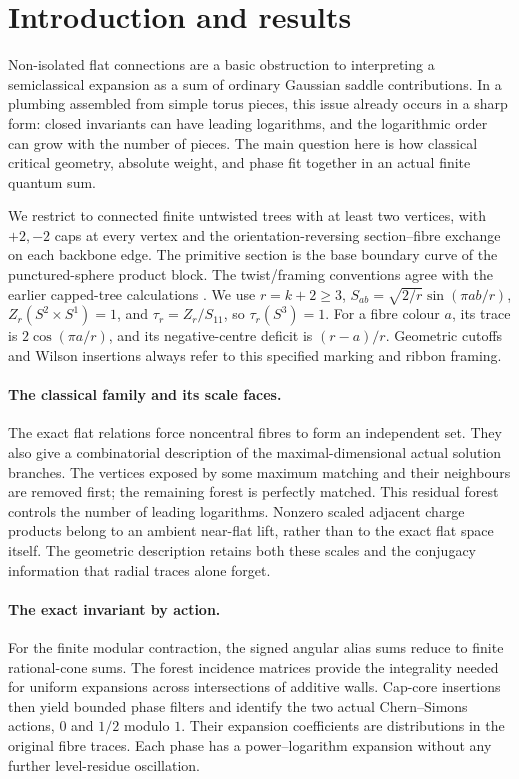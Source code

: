 \section{Introduction and results}\label{intro:main}
Non-isolated flat connections are a basic obstruction to interpreting a semiclassical expansion as a sum of ordinary Gaussian saddle contributions. In a plumbing assembled from simple torus pieces, this issue already occurs in a sharp form: closed invariants can have leading logarithms, and the logarithmic order can grow with the number of pieces. The main question here is how classical critical geometry, absolute weight, and phase fit together in an actual finite quantum sum.

We restrict to connected finite untwisted trees with at least two vertices, with \(+2,-2\) caps at every vertex and the orientation-reversing section--fibre exchange on each backbone edge. The primitive section is the base boundary curve of the punctured-sphere product block. The twist/framing conventions agree with the earlier capped-tree calculations \cite{P48,P49,P49B,P4849}. We use \(r=k+2\geq 3\), \(S_{ab}=\sqrt{2/r}\sin(\pi ab/r)\), \(Z_r(S^2\times S^1)=1\), and \(\tau_r=Z_r/S_{11}\), so \(\tau_r(S^3)=1\). For a fibre colour \(a\), its trace is \(2\cos(\pi a/r)\), and its negative-centre deficit is \((r-a)/r\). Geometric cutoffs and Wilson insertions always refer to this specified marking and ribbon framing.

\paragraph{The classical family and its scale faces.}
The exact flat relations force noncentral fibres to form an independent set. They also give a combinatorial description of the maximal-dimensional actual solution branches. The vertices exposed by some maximum matching and their neighbours are removed first; the remaining forest is perfectly matched. This residual forest controls the number of leading logarithms. Nonzero scaled adjacent charge products belong to an ambient near-flat lift, rather than to the exact flat space itself. The geometric description retains both these scales and the conjugacy information that radial traces alone forget.

\paragraph{The exact invariant by action.}
For the finite modular contraction, the signed angular alias sums reduce to finite rational-cone sums. The forest incidence matrices provide the integrality needed for uniform expansions across intersections of additive walls. Cap-core insertions then yield bounded phase filters and identify the two actual Chern--Simons actions, \(0\) and \(1/2\) modulo \(1\). Their expansion coefficients are distributions in the original fibre traces. Each phase has a power--logarithm expansion without any further level-residue oscillation.

